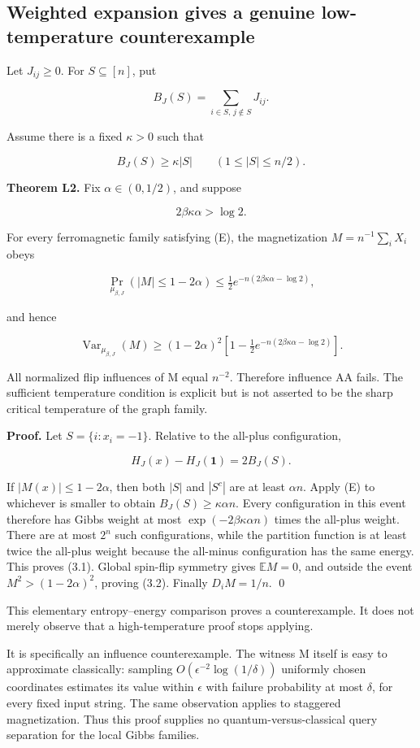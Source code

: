 \subsection{Weighted expansion gives a genuine low-temperature
counterexample}\label{proof:local_interactions:weighted-expansion-gives-a-genuine-low-temperature-counterexample}

Let \(J_{ij}\ge 0\). For \(S\subseteq [n]\), put

\[
B_J(S)=\sum_{i\in S,\,j\notin S}J_{ij}.
\]

Assume there is a fixed \(\kappa >0\) such that

\[
B_J(S)\ge\kappa |S|\qquad(1\le |S|\le n/2).
\tag{E}
\]

\textbf{Theorem L2.} Fix \(\alpha \in (0,1/2)\), and suppose

\[
2\beta\kappa\alpha>\log2.
\tag{LT}
\]

For every ferromagnetic family satisfying (E), the magnetization
\(M=n^{-1}\sum_iX_i\) obeys

\[
\Pr_{\mu_{\beta,J}}(|M|\le1-2\alpha)
\le\tfrac12 e^{-n(2\beta\kappa\alpha-\log2)},
\tag{3.1}
\]

and hence

\[
\operatorname{Var}_{\mu_{\beta,J}}(M)
\ge(1-2\alpha)^2\left[1-\tfrac12e^{-n(2\beta\kappa\alpha-\log2)}\right].
\tag{3.2}
\]

All normalized flip influences of M equal \(n^{-2}\). Therefore
influence AA fails. The sufficient temperature condition is explicit but
is not asserted to be the sharp critical temperature of the graph
family.

\textbf{Proof.} Let \(S=\{i:x_i=-1\}\). Relative to the all-plus
configuration,

\[
H_J(x)-H_J(\mathbf1)=2B_J(S).
\]

If \(|M(x)|\le 1-2\alpha\), then both \(|S|\) and \(|S^{c}|\) are at
least \(\alpha n\). Apply (E) to whichever is smaller to obtain
\(B_J(S)\ge \kappa \alpha n\). Every configuration in this event
therefore has Gibbs weight at most \(\exp (-2\beta \kappa \alpha n)\)
times the all-plus weight. There are at most \(2^n\) such
configurations, while the partition function is at least twice the
all-plus weight because the all-minus configuration has the same energy.
This proves (3.1). Global spin-flip symmetry gives \(\mathbb{E} M=0\),
and outside the event \(M^{2}>(1-2\alpha )^{2}\), proving (3.2). Finally
\(D_iM=1/n\). \qed

This elementary entropy--energy comparison proves a counterexample. It
does not merely observe that a high-temperature proof stops applying.

It is specifically an influence counterexample. The witness M itself is
easy to approximate classically: sampling
\(O(\epsilon ^{-2}\log (1/\delta ))\) uniformly chosen coordinates
estimates its value within \(\epsilon\) with failure probability at most
\(\delta\), for every fixed input string. The same observation applies
to staggered magnetization. Thus this proof supplies no
quantum-versus-classical query separation for the local Gibbs families.

